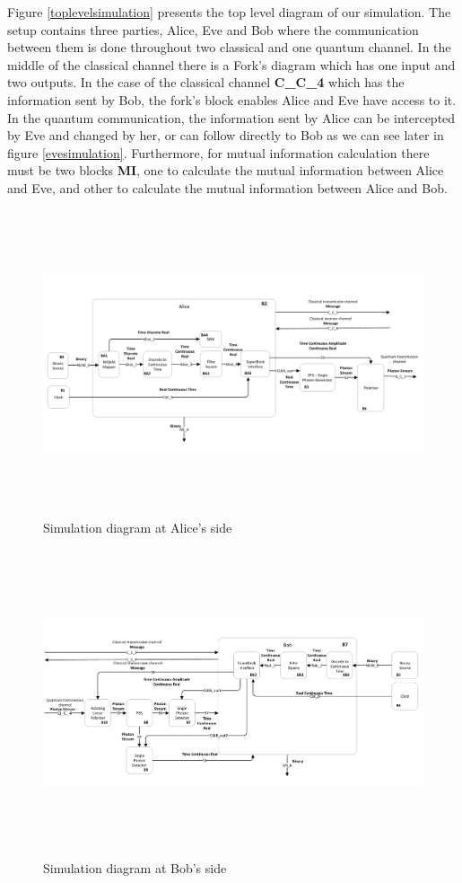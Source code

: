 \begin{enumerate}
Figure \ref{toplevelsimulation} presents the top level diagram of our simulation. The setup contains three parties, Alice, Eve and Bob where the communication between them is done throughout two classical and one quantum channel. In the middle of the classical channel there is a Fork's diagram which has one input and two outputs. In the case of the classical channel \textbf{C\_C\_4} which has the information sent by Bob, the fork's block enables Alice and Eve have access to it. In the quantum communication, the information sent by Alice can be intercepted by Eve and changed by her, or can follow directly to Bob as we can see later in figure \ref{evesimulation}. Furthermore, for mutual information calculation there must be two blocks \textbf{MI}, one to calculate the mutual information between Alice and Eve, and other to calculate the mutual information between Alice and Bob.

\begin{figure}[h]
	\centering
	\includegraphics[width=1.0\textwidth, height=9cm]{./sdf/bb84_with_discrete_variables/figures/alice_simulation.png}
	\caption{Simulation diagram at Alice's side}\label{alicesimulation}
\end{figure}

\begin{figure}[h]
	\centering
	\includegraphics[width=1.0\textwidth, height=9cm]{./sdf/bb84_with_discrete_variables/figures/bob_simulation.png}
	\caption{Simulation diagram at Bob's side}\label{bobsimulation}
\end{figure}


\end{enumerate}

